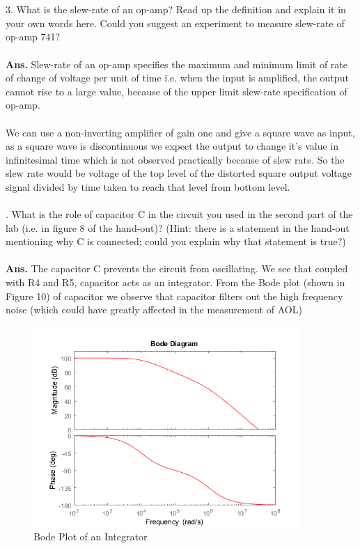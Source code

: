 \documentclass[12pt]{article}
\begin{document}
\\\\
3. What is the slew-rate of an op-amp? Read up the definition and explain it in your own words here. Could you suggest an experiment to measure slew-rate of op-amp 741?\\
\\
\textbf{Ans.} Slew-rate of an op-amp specifies the maximum and minimum limit of rate of change of voltage per unit of time i.e. when the input is amplified, the output cannot rise to a large value, because of the upper limit slew-rate specification of op-amp.
\\\\
We can use a non-inverting amplifier of gain one and give a square wave as input, as a square wave is discontinuous we expect the output to change it's value in infinitesimal time which is not observed practically because of slew rate. So the slew rate would be voltage of the top level of the distorted square output voltage signal divided by time taken to reach that level from bottom level. 
\\\\
. What is the role of capacitor C in the circuit you used in the second part of the lab (i.e. in figure 8 of the hand-out)? (Hint: there is a statement in the hand-out mentioning why C is connected; could you explain why that statement is true?)\\
\\
\textbf{Ans.} The capacitor C prevents the circuit from oscillating. We see that
coupled with R4 and R5, capacitor acts as an integrator. From the Bode plot
(shown in Figure 10) of capacitor we observe that capacitor filters out the
high frequency noise (which could have greatly affected in the measurement
of AOL)

        \begin{figure}[H]
            \centering
            \includegraphics[width = 0.5\linewidth, height = 3in]{opampdemo_01.png}
            \caption{ Bode Plot of an Integrator}
        \end{figure}
\end{document}
